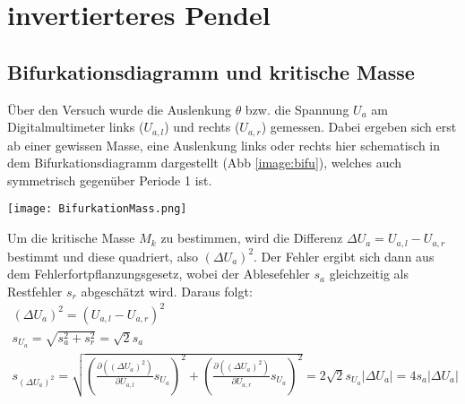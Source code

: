 

\section{invertierteres Pendel}
\label{sec:auswertungPendel}
\subsection{Bifurkationsdiagramm und kritische Masse}
\label{sub:bifuAndKritMass}
Über den Versuch wurde die Auslenkung $\theta$ bzw. die Spannung $U_a$ am Digitalmultimeter links ($U_{a,l}$) und rechts ($U_{a,r}$) gemessen. Dabei ergeben sich erst ab einer gewissen Masse, eine Auslenkung links oder rechts hier schematisch in dem Bifurkationsdiagramm dargestellt (Abb \ref{image:bifu}), welches auch symmetrisch gegenüber Periode 1 ist.
\begin{center}
    \texttt{[image: BifurkationMass.png]}
    \label{image:bifu}
\end{center}
Um die kritische Masse $M_k$ zu bestimmen, wird die Differenz $\Delta U_a=U_{a,l}-U_{a,r}$ bestimmt und diese quadriert, also $(\Delta U_a)^2$. Der Fehler ergibt sich dann aus dem Fehlerfortpflanzungsgesetz, wobei der Ablesefehler $s_a$ gleichzeitig als Restfehler $s_r$ abgeschätzt wird. Daraus folgt:
\begin{gather}
    (\Delta U_a)^2 = (U_{a,l}-U_{a,r})^2\\
    s_{U_a}=\sqrt{s_a^2+s_r^2}=\sqrt{2}s_a\\[0,5cm]
    s_{(\Delta U_a)^2}=\sqrt{\left(\frac{\partial((\Delta U_a)^2)}{\partial U_{a,l}}s_{U_a}\right)^2 + \left(\frac{\partial((\Delta U_a)^2)}{\partial U_{a,r}}s_{U_a}\right)^2}=2\sqrt{2}s_{U_a}|\Delta U_a|=4s_a |\Delta U_a|
\end{gather}
